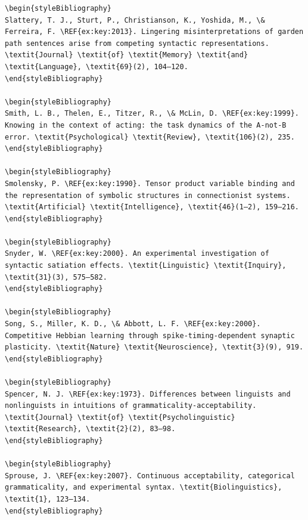 \begin{verbatim}
\begin{styleBibliography}
Slattery, T. J., Sturt, P., Christianson, K., Yoshida, M., \& Ferreira, F. \REF{ex:key:2013}. Lingering misinterpretations of garden path sentences arise from competing syntactic representations. \textit{Journal} \textit{of} \textit{Memory} \textit{and} \textit{Language}, \textit{69}(2), 104–120.
\end{styleBibliography}

\begin{styleBibliography}
Smith, L. B., Thelen, E., Titzer, R., \& McLin, D. \REF{ex:key:1999}. Knowing in the context of acting: the task dynamics of the A-not-B error. \textit{Psychological} \textit{Review}, \textit{106}(2), 235.
\end{styleBibliography}

\begin{styleBibliography}
Smolensky, P. \REF{ex:key:1990}. Tensor product variable binding and the representation of symbolic structures in connectionist systems. \textit{Artificial} \textit{Intelligence}, \textit{46}(1–2), 159–216.
\end{styleBibliography}

\begin{styleBibliography}
Snyder, W. \REF{ex:key:2000}. An experimental investigation of syntactic satiation effects. \textit{Linguistic} \textit{Inquiry}, \textit{31}(3), 575–582.
\end{styleBibliography}

\begin{styleBibliography}
Song, S., Miller, K. D., \& Abbott, L. F. \REF{ex:key:2000}. Competitive Hebbian learning through spike-timing-dependent synaptic plasticity. \textit{Nature} \textit{Neuroscience}, \textit{3}(9), 919.
\end{styleBibliography}

\begin{styleBibliography}
Spencer, N. J. \REF{ex:key:1973}. Differences between linguists and nonlinguists in intuitions of grammaticality-acceptability. \textit{Journal} \textit{of} \textit{Psycholinguistic} \textit{Research}, \textit{2}(2), 83–98.
\end{styleBibliography}

\begin{styleBibliography}
Sprouse, J. \REF{ex:key:2007}. Continuous acceptability, categorical grammaticality, and experimental syntax. \textit{Biolinguistics}, \textit{1}, 123–134.
\end{styleBibliography}


\end{verbatim}
